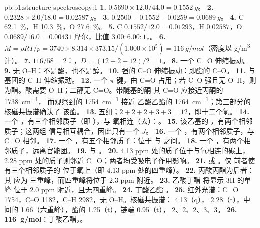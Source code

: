 \begin{solution}{pb:b1:structure-spectroscopy:1}
\textbf{1.} $0.5690 \times 12.0/44.0 = \qty{0.1552}{g}$。
\textbf{2.} $0.2328 \times 2.0/18.0 = \qty{0.02587}{g}$。
\textbf{3.} $0.2500 - 0.1552 - 0.0259 = \qty{0.0689}{g}$。
\textbf{4.} C \qty{62.1}{\percent}，H \qty{10.3}{\percent}，O
\qty{27.6}{\percent}。
\textbf{5.} C $0.1552/12.0 = 0.01293$，H $0.02587$，O $0.0689/16.0 =
0.00431$ 摩尔，比值 $3.00 : 6.00 : 1$，。
\textbf{6.} $M = \rho RT/p = 3740 \times 8.314 \times 373.15/(1.000 \times 10^5) =
\qty{116}{g/mol}$（密度以 \unit{g/m^3} 计）。
\textbf{7.} $116/58 = 2$：，$D = (12 + 2 - 12)/2 = 1$。
\textbf{8.} 一个 C=O 伸缩振动。
\textbf{9.} 无 O--H：不是酸，也不是醇。
\textbf{10.} 强的 C--O 伸缩振动：即酯的 C--O。
\textbf{11.}  与  基团的 C--H 伸缩振动。
\textbf{12.} 一个 $\pi$ 键，由 C=O 占用；若 C--O 强且无
O--H，则为酯。酸需要 O--H；二醇无 C=O。带醚基的酮
其 C=O 应接近丙酮的 \qty{1738}{cm^{-1}}，
而观察到的 \qty{1754}{cm^{-1}} 接近
乙酸乙酯的 \qty{1764}{cm^{-1}}；第三部分的核磁共振谱确认了
该酯。
\textbf{13.} 五组；$2 + 2 + 2 + 3 + 3 = 12$，即十二个氢。
\textbf{14.} 一个 ，有三个相邻质子（即 ），与
氧相连（去）：。
\textbf{15.} 该乙基的 ，有两个相邻质子；这两组
信号相互耦合，因此只有一个 $J$。
\textbf{16.} 一个 ，有两个相邻质子，与 C=O 相邻。
\textbf{17.} 一个 ，有五个相邻质子：位于  与
 之间。
\textbf{18.} 一个 ，有两个相邻质子，远离官能团。
\textbf{19.}  与 。
\textbf{20.} 4.13 ppm 处的质子位于与氧相连的碳上，
2.28 ppm 处的质子则邻近 C=O；两者均受吸电子作用影响。
\textbf{21.}  或 。仅
前者使有三个相邻质子的  位于氧上（即
4.13 ppm 处的四重峰）。
\textbf{22.} 丙酸丙酯为后者：其  应为
三重峰，而四重峰将位于 2.3 ppm 附近。
\textbf{23.} 乙酸丁酯  将显示 3H 的单峰
位于 2.0 ppm 附近，且无四重峰。
\textbf{24.} 丁酸乙酯 。
\textbf{25.} 红外光谱：C=O 1754，C--O 1182，C--H 2982，无 O--H。核磁共振谱：
4.13（q）， 2.28（t），中间的  1.66（六重峰），酯的
 1.25（t），链端  0.95（t）， 2、2、2、3、3。
\textbf{26.} \textbf{\qty{116}{g/mol}}：丁酸乙酯，。
\end{solution}
